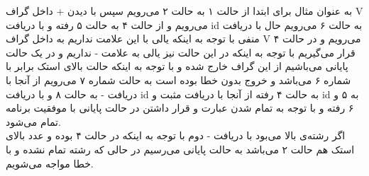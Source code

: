 {\begin{enumerate}
\begin{latin}
\begin{center}
\begin{tikzpicture}
			\end{tikzpicture}
		\end{center}
	\end{latin}
به عنوان مثال برای  ابتدا از حالت ۱ به حالت ۲ می‌رویم سپس با دیدن + داخل گراف  V می‌رویم و از حالت ۴ به حالت ۵ رفته و با دریافت id به حالت ۶ می‌رویم حال با دریافت منفی با توجه به اینکه یالی با این علامت نداریم به داخل گراف V می‌رویم و در حالت ۴ قرار می‌گیریم با توجه به اینکه در این حالت نیز یالی به علامت - نداریم و در یک حالت پایانی می‌باشیم از این گراف خارج شده و با توجه به اینکه حالت بالای استک برابر با شماره ۶ می‌باشد و خروج بدون خطا بوده است به حالت شماره ۷ می‌رویم از آنجا با دریافت - به حالت ۸ و با دریافت id به حالت ۴ رفته  از آنجا با دریافت مثبت و id به ۵ و ۶ رفته و با توجه به تمام شدن عبارت و قرار داشتن در حالت پایانی با موفقیت برنامه تمام می‌شود.\\
اگر رشته‌ی بالا  می‌بود با دریافت - دوم با توجه به اینکه در حالت ۴ بوده و عدد بالای استک هم حالت ۲ می‌باشد به حالت پایانی می‌رسیم در حالی که رشته تمام نشده و با خطا مواجه می‌شویم.
\end{enumerate} 

}